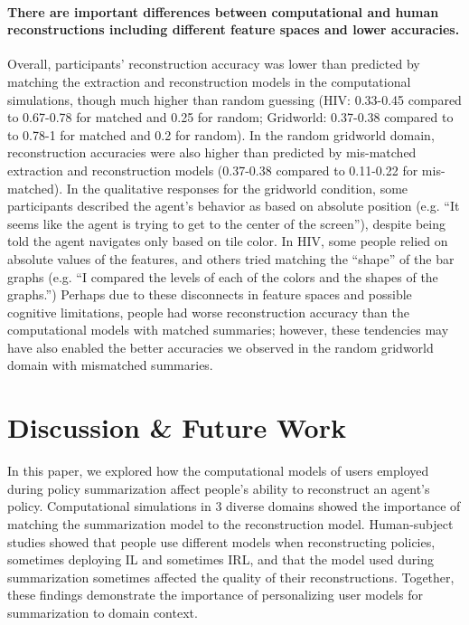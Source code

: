 \documentclass{article}
\begin{document}
\paragraph{There are important differences between computational and human reconstructions including different feature spaces and lower accuracies.} Overall, participants' reconstruction accuracy was lower than predicted by matching the extraction and reconstruction models in the computational simulations, though much higher than random guessing (HIV: 0.33-0.45 compared to 0.67-0.78 for matched and 0.25 for random; Gridworld: 0.37-0.38 compared to to 0.78-1 for matched and 0.2 for random). In the random gridworld domain, reconstruction accuracies were also higher than predicted by mis-matched extraction and reconstruction models (0.37-0.38 compared to 0.11-0.22 for mis-matched). In the qualitative responses for the gridworld condition, some participants described the agent's behavior as based on absolute position (e.g. ``It seems like the agent is trying to get to the center of the screen''), despite being told the agent navigates only based on tile color. In HIV, some people relied on absolute values of the features, and others tried matching the ``shape'' of the bar graphs (e.g. ``I compared the levels of each of the colors and the shapes of the graphs.'') Perhaps due to these disconnects in feature spaces and possible cognitive limitations, people had worse reconstruction accuracy than the computational models with matched summaries; however, these tendencies may have also enabled the better accuracies we observed in the random gridworld domain with mismatched summaries. 

\section{Discussion \& Future Work} 

In this paper, we explored how the computational models of users employed during policy summarization affect people's ability to reconstruct an agent's policy. Computational simulations in 3 diverse domains showed the importance of matching the summarization model to the reconstruction model. Human-subject studies showed that people use different models when reconstructing policies, sometimes deploying IL and sometimes IRL, and that the model used during summarization sometimes affected the quality of their reconstructions. Together, these findings demonstrate the importance of personalizing user models for summarization to domain context.
\end{document}
